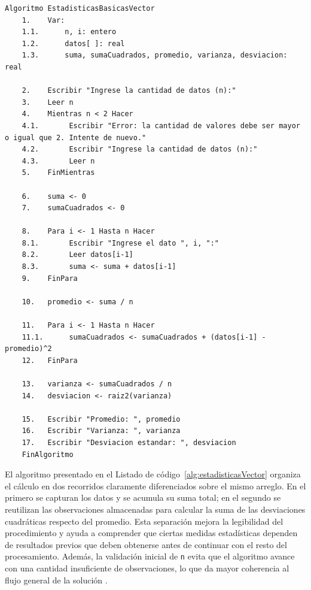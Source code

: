 \documentclass[12pt,twoside]{book}
\begin{document}
					\begin{lstlisting}[style=upsamStyle,caption={Cálculo del promedio, la varianza y la desviación estándar de un conjunto de datos},label={alg:estadisticasVector}]
	Algoritmo EstadisticasBasicasVector
	1.    Var:
	1.1.      n, i: entero
	1.2.      datos[ ]: real
	1.3.      suma, sumaCuadrados, promedio, varianza, desviacion: real
	
	2.    Escribir "Ingrese la cantidad de datos (n):"
	3.    Leer n
	4.    Mientras n < 2 Hacer
	4.1.       Escribir "Error: la cantidad de valores debe ser mayor o igual que 2. Intente de nuevo."
	4.2.       Escribir "Ingrese la cantidad de datos (n):"
	4.3.       Leer n
	5.    FinMientras
	
	6.    suma <- 0
	7.    sumaCuadrados <- 0
	
	8.    Para i <- 1 Hasta n Hacer
	8.1.       Escribir "Ingrese el dato ", i, ":"
	8.2.       Leer datos[i-1]
	8.3.       suma <- suma + datos[i-1]
	9.    FinPara
	
	10.   promedio <- suma / n
	
	11.   Para i <- 1 Hasta n Hacer
	11.1.      sumaCuadrados <- sumaCuadrados + (datos[i-1] - promedio)^2
	12.   FinPara
	
	13.   varianza <- sumaCuadrados / n
	14.   desviacion <- raiz2(varianza)
	
	15.   Escribir "Promedio: ", promedio
	16.   Escribir "Varianza: ", varianza
	17.   Escribir "Desviacion estandar: ", desviacion
	FinAlgoritmo \end{lstlisting}
				
				\noindent
				El algoritmo presentado en el Listado de código~\ref{alg:estadisticasVector} organiza el cálculo en dos recorridos claramente diferenciados sobre el mismo arreglo. En el primero se capturan los datos y se acumula su suma total; en el segundo se reutilizan las observaciones almacenadas para calcular la suma de las desviaciones cuadráticas respecto del promedio. Esta separación mejora la legibilidad del procedimiento y ayuda a comprender que ciertas medidas estadísticas dependen de resultados previos que deben obtenerse antes de continuar con el resto del procesamiento. Además, la validación inicial de \texttt{n} evita que el algoritmo avance con una cantidad insuficiente de observaciones, lo que da mayor coherencia al flujo general de la solución \cite{Gaddis2022Starting,Farrell2018Programming,Pressman2019Software,Sommerville2015Software}.
			
\end{document}
